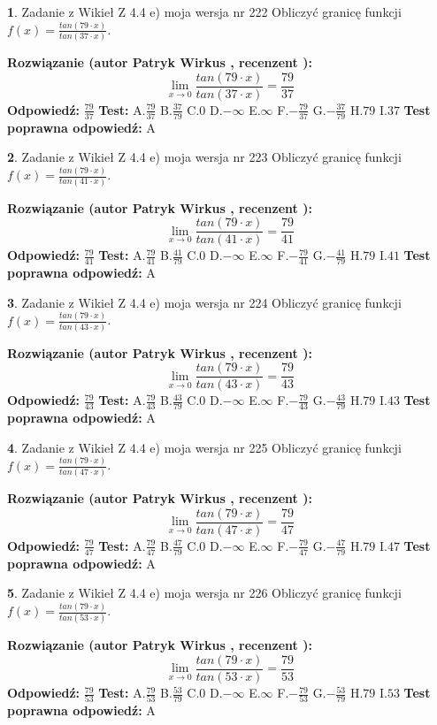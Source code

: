\documentclass[12pt, a4paper]{article}
\theoremstyle{definition} %
\newtheorem{zad}{}
\newcommand{\zadStart}[1]{\begin{zad}#1\newline}
\newcommand{\zadStop}{\end{zad}}
\newcommand{\rozwStart}[2]{\noindent \textbf{Rozwiązanie (autor #1 , recenzent #2): }\newline}
\newcommand{\rozwStop}{\newline}
\newcommand{\odpStart}{\noindent \textbf{Odpowiedź:}\newline}
\newcommand{\odpStop}{\newline}
\newcommand{\testStart}{\noindent \textbf{Test:}\newline}
\newcommand{\testStop}{\newline}
\newcommand{\kluczStart}{\noindent \textbf{Test poprawna odpowiedź:}\newline}
\newcommand{\kluczStop}{\newline}
\begin{document}
\zadStart{Zadanie z Wikieł Z 4.4 e) moja wersja nr 222}
Obliczyć granicę funkcji $f(x)=\frac{tan(79\cdot x)}{tan(37\cdot x)}$.
\zadStop
\rozwStart{Patryk Wirkus}{}
$$\lim\limits_{x\to 0}\frac{tan(79\cdot x)}{tan(37\cdot x)}=
\frac{79}{37}$$
\rozwStop
\odpStart
$\frac{79}{37}$
\odpStop
\testStart
A.$\frac{79}{37}$
B.$\frac{37}{79}$
C.$0$
D.$-\infty$
E.$\infty$
F.$-\frac{79}{37}$
G.$-\frac{37}{79}$
H.$79$
I.$37$
\testStop
\kluczStart
A
\kluczStop



\zadStart{Zadanie z Wikieł Z 4.4 e) moja wersja nr 223}
Obliczyć granicę funkcji $f(x)=\frac{tan(79\cdot x)}{tan(41\cdot x)}$.
\zadStop
\rozwStart{Patryk Wirkus}{}
$$\lim\limits_{x\to 0}\frac{tan(79\cdot x)}{tan(41\cdot x)}=
\frac{79}{41}$$
\rozwStop
\odpStart
$\frac{79}{41}$
\odpStop
\testStart
A.$\frac{79}{41}$
B.$\frac{41}{79}$
C.$0$
D.$-\infty$
E.$\infty$
F.$-\frac{79}{41}$
G.$-\frac{41}{79}$
H.$79$
I.$41$
\testStop
\kluczStart
A
\kluczStop



\zadStart{Zadanie z Wikieł Z 4.4 e) moja wersja nr 224}
Obliczyć granicę funkcji $f(x)=\frac{tan(79\cdot x)}{tan(43\cdot x)}$.
\zadStop
\rozwStart{Patryk Wirkus}{}
$$\lim\limits_{x\to 0}\frac{tan(79\cdot x)}{tan(43\cdot x)}=
\frac{79}{43}$$
\rozwStop
\odpStart
$\frac{79}{43}$
\odpStop
\testStart
A.$\frac{79}{43}$
B.$\frac{43}{79}$
C.$0$
D.$-\infty$
E.$\infty$
F.$-\frac{79}{43}$
G.$-\frac{43}{79}$
H.$79$
I.$43$
\testStop
\kluczStart
A
\kluczStop



\zadStart{Zadanie z Wikieł Z 4.4 e) moja wersja nr 225}
Obliczyć granicę funkcji $f(x)=\frac{tan(79\cdot x)}{tan(47\cdot x)}$.
\zadStop
\rozwStart{Patryk Wirkus}{}
$$\lim\limits_{x\to 0}\frac{tan(79\cdot x)}{tan(47\cdot x)}=
\frac{79}{47}$$
\rozwStop
\odpStart
$\frac{79}{47}$
\odpStop
\testStart
A.$\frac{79}{47}$
B.$\frac{47}{79}$
C.$0$
D.$-\infty$
E.$\infty$
F.$-\frac{79}{47}$
G.$-\frac{47}{79}$
H.$79$
I.$47$
\testStop
\kluczStart
A
\kluczStop



\zadStart{Zadanie z Wikieł Z 4.4 e) moja wersja nr 226}
Obliczyć granicę funkcji $f(x)=\frac{tan(79\cdot x)}{tan(53\cdot x)}$.
\zadStop
\rozwStart{Patryk Wirkus}{}
$$\lim\limits_{x\to 0}\frac{tan(79\cdot x)}{tan(53\cdot x)}=
\frac{79}{53}$$
\rozwStop
\odpStart
$\frac{79}{53}$
\odpStop
\testStart
A.$\frac{79}{53}$
B.$\frac{53}{79}$
C.$0$
D.$-\infty$
E.$\infty$
F.$-\frac{79}{53}$
G.$-\frac{53}{79}$
H.$79$
I.$53$
\testStop
\kluczStart
A
\kluczStop
\end{document}
